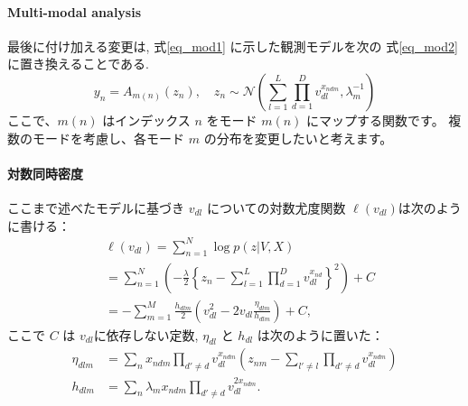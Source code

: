 \documentclass[a4paper,12ptc]{jsarticle} %
\newcommand{\C}{C}
\begin{document}
\paragraph{Multi-modal analysis} 
最後に付け加える変更は, 式\ref{eq_mod1} に示した観測モデルを次の 式\ref{eq_mod2}  に置き換えることである.
\begin{equation}
y_{n} = A_{m(n)}(z_{n}), \quad z_{n} \sim \mathcal{N}\left(\sum_{l=1}^L \prod_{d=1}^Dv_{dl}^{x_{ndm}}, \lambda^{-1}_m\right) \label{eq_mod2}    
\end{equation}
ここで、$m(n)$ はインデックス $n$ をモード $m(n)$ にマップする関数です。
複数のモードを考慮し、各モード $m$ の分布を変更したいと考えます。

\paragraph{対数同時密度}
ここまで述べたモデルに基づき $v_{dl}$ についての対数尤度関数 $\ell(v_{dl})$は次のように書ける：
\begin{align*}
& \ell(v_{dl}) =\sum_{n=1}^{N} \log p(z|V, X)\\
&= \sum_{n=1}^{N}\left(-\frac{\lambda}{2}\left\{ z_n -\sum_{l=1}^L\prod_{d=1}^D v_{dl}^{x_{nd}} \right\}^2\right)+ \C\\
&= -\sum_{m=1}^M\frac{h_{dlm}}{2}\left(v_{dl}^2-2v_{dl}\frac{\eta_{dlm}}{h_{dlm}}\right) +C,
\end{align*}
ここで $C$ は $v_{dl}$に依存しない定数, $\eta_{dl}$ と $h_{dl}$ は次のように置いた：
\begin{align}
\eta_{dlm} &= \sum_n x_{ndm} \prod_{d' \neq d} v_{dl}^{x_{ndm}}\left( z_{nm} - \sum_{l'\neq l} \prod_{d' \neq d} v_{dl}^{x_{ndm}} \right) \label{eq_eta}\\
h_{dlm} &= \sum_n \lambda_m x_{ndm} \prod_{d' \neq d} v_{dl}^{2x_{ndm}}. \label{eq_h}
\end{align}
\end{document}
